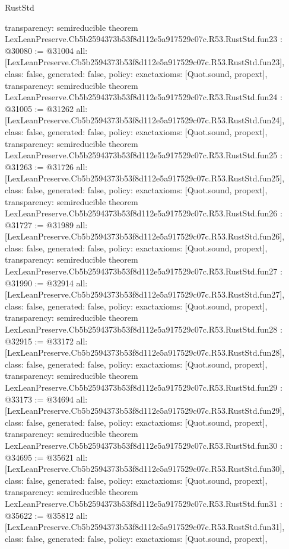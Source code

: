 \begin{lexlean}{RustStd}
\begin{coremodule}
{  transparency: semireducible
}
theorem LexLeanPreserve.Cb5b2594373b53f8d112e5a917529c07c.R53.RustStd.fun23 : @30080 := @31004 {
  all: [LexLeanPreserve.Cb5b2594373b53f8d112e5a917529c07c.R53.RustStd.fun23],
  class: false,
  generated: false,
  policy: exact{axioms: [Quot.sound, propext]},
  transparency: semireducible
}
theorem LexLeanPreserve.Cb5b2594373b53f8d112e5a917529c07c.R53.RustStd.fun24 : @31005 := @31262 {
  all: [LexLeanPreserve.Cb5b2594373b53f8d112e5a917529c07c.R53.RustStd.fun24],
  class: false,
  generated: false,
  policy: exact{axioms: [Quot.sound, propext]},
  transparency: semireducible
}
theorem LexLeanPreserve.Cb5b2594373b53f8d112e5a917529c07c.R53.RustStd.fun25 : @31263 := @31726 {
  all: [LexLeanPreserve.Cb5b2594373b53f8d112e5a917529c07c.R53.RustStd.fun25],
  class: false,
  generated: false,
  policy: exact{axioms: [Quot.sound, propext]},
  transparency: semireducible
}
theorem LexLeanPreserve.Cb5b2594373b53f8d112e5a917529c07c.R53.RustStd.fun26 : @31727 := @31989 {
  all: [LexLeanPreserve.Cb5b2594373b53f8d112e5a917529c07c.R53.RustStd.fun26],
  class: false,
  generated: false,
  policy: exact{axioms: [Quot.sound, propext]},
  transparency: semireducible
}
theorem LexLeanPreserve.Cb5b2594373b53f8d112e5a917529c07c.R53.RustStd.fun27 : @31990 := @32914 {
  all: [LexLeanPreserve.Cb5b2594373b53f8d112e5a917529c07c.R53.RustStd.fun27],
  class: false,
  generated: false,
  policy: exact{axioms: [Quot.sound, propext]},
  transparency: semireducible
}
theorem LexLeanPreserve.Cb5b2594373b53f8d112e5a917529c07c.R53.RustStd.fun28 : @32915 := @33172 {
  all: [LexLeanPreserve.Cb5b2594373b53f8d112e5a917529c07c.R53.RustStd.fun28],
  class: false,
  generated: false,
  policy: exact{axioms: [Quot.sound, propext]},
  transparency: semireducible
}
theorem LexLeanPreserve.Cb5b2594373b53f8d112e5a917529c07c.R53.RustStd.fun29 : @33173 := @34694 {
  all: [LexLeanPreserve.Cb5b2594373b53f8d112e5a917529c07c.R53.RustStd.fun29],
  class: false,
  generated: false,
  policy: exact{axioms: [Quot.sound, propext]},
  transparency: semireducible
}
theorem LexLeanPreserve.Cb5b2594373b53f8d112e5a917529c07c.R53.RustStd.fun30 : @34695 := @35621 {
  all: [LexLeanPreserve.Cb5b2594373b53f8d112e5a917529c07c.R53.RustStd.fun30],
  class: false,
  generated: false,
  policy: exact{axioms: [Quot.sound, propext]},
  transparency: semireducible
}
theorem LexLeanPreserve.Cb5b2594373b53f8d112e5a917529c07c.R53.RustStd.fun31 : @35622 := @35812 {
  all: [LexLeanPreserve.Cb5b2594373b53f8d112e5a917529c07c.R53.RustStd.fun31],
  class: false,
  generated: false,
  policy: exact{axioms: [Quot.sound, propext]},
}
\end{coremodule}
\end{lexlean}
